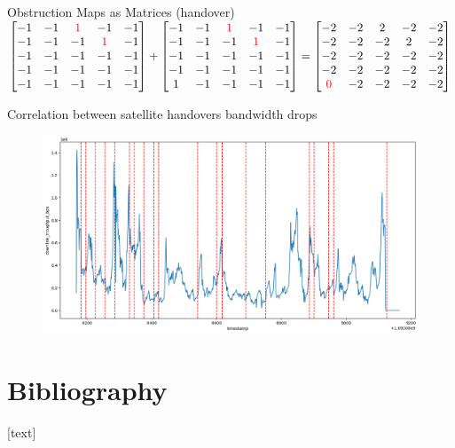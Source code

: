 \documentclass[NET,english,beameralt]{tumbeamer}
\begin{document}
\begin{frame}{Obstruction Maps as Matrices (handover)}
    $\begin{bmatrix}
        -1 & -1 & \color{red}1 &           -1 & -1 \\
        -1 & -1 &           -1 & \color{red}1 & -1 \\
        -1 & -1 &           -1 &           -1 & -1 \\
        -1 & -1 &           -1 &           -1 & -1 \\
        -1 & -1 &           -1 &           -1 & -1 \\
    \end{bmatrix}
    +
    \begin{bmatrix}
        -1 & -1 & \color{red}1 &           -1 & -1 \\
        -1 & -1 &           -1 & \color{red}1 & -1 \\
        -1 & -1 &           -1 &           -1 & -1 \\
        -1 & -1 &           -1 &           -1 & -1 \\
        1 & -1 &            -1 &           -1 & -1 \\
    \end{bmatrix}
    =
    \begin{bmatrix}
        -2 & -2 & 2 & -2 & -2 \\
        -2 & -2 & -2 & 2 & -2 \\
        -2 & -2 & -2 & -2 & -2 \\
        -2 & -2 & -2 & -2 & -2 \\
        \color{red}0 & -2 & -2 & -2 & -2 \\
    \end{bmatrix}$
\end{frame}

\begin{frame}[fragile]{Correlation between satellite handovers bandwidth drops}
    \begin{figure}
        \includegraphics[width=0.8\columnwidth]{pics/correlation_handovers_bw.png}
    \end{figure}
\end{frame}

\section{Bibliography}
\begin{frame}[allowframebreaks]
    
    [text]
    \footnotesize
    
\end{frame}
\end{document}
